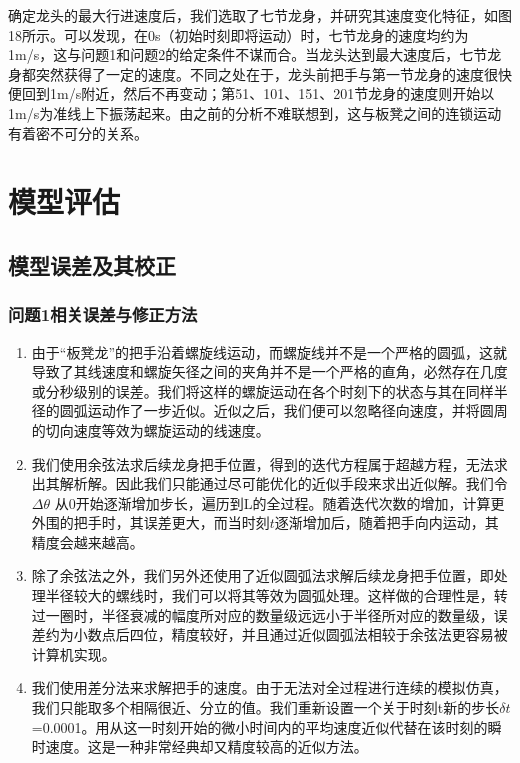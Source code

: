\documentclass{cumcmthesis1}
\begin{document}
确定龙头的最大行进速度后，我们选取了七节龙身，并研究其速度变化特征，如图18所示。可以发现，在0s（初始时刻即将运动）时，七节龙身的速度均约为1m/s，这与问题1和问题2的给定条件不谋而合。当龙头达到最大速度后，七节龙身都突然获得了一定的速度。不同之处在于，龙头前把手与第一节龙身的速度很快便回到1m/s附近，然后不再变动；第51、101、151、201节龙身的速度则开始以1m/s为准线上下振荡起来。由之前的分析不难联想到，这与板凳之间的连锁运动有着密不可分的关系。




\section{模型评估}
\subsection{模型误差及其校正}
\subsubsection{问题1相关误差与修正方法}
\begin{enumerate}
    \item 由于“板凳龙”的把手沿着螺旋线运动，而螺旋线并不是一个严格的圆弧，这就导致了其线速度和螺旋矢径之间的夹角并不是一个严格的直角，必然存在几度或分秒级别的误差。我们将这样的螺旋运动在各个时刻下的状态与其在同样半径的圆弧运动作了一步近似。近似之后，我们便可以忽略径向速度，并将圆周的切向速度等效为螺旋运动的线速度。
    \item 我们使用余弦法求后续龙身把手位置，得到的迭代方程属于超越方程，无法求出其解析解。因此我们只能通过尽可能优化的近似手段来求出近似解。我们令$\Delta \theta$ 从0开始逐渐增加步长，遍历到L的全过程。随着迭代次数的增加，计算更外围的把手时，其误差更大，而当时刻$t$逐渐增加后，随着把手向内运动，其精度会越来越高。
    \item 除了余弦法之外，我们另外还使用了近似圆弧法求解后续龙身把手位置，即处理半径较大的螺线时，我们可以将其等效为圆弧处理。这样做的合理性是，转过一圈时，半径衰减的幅度所对应的数量级远远小于半径所对应的数量级，误差约为小数点后四位，精度较好，并且通过近似圆弧法相较于余弦法更容易被计算机实现。
    \item 我们使用差分法来求解把手的速度。由于无法对全过程进行连续的模拟仿真，我们只能取多个相隔很近、分立的值。我们重新设置一个关于时刻t新的步长$\delta t$=0.0001。用从这一时刻开始的微小时间内的平均速度近似代替在该时刻的瞬时速度。这是一种非常经典却又精度较高的近似方法。
\end{enumerate}
\end{document}
